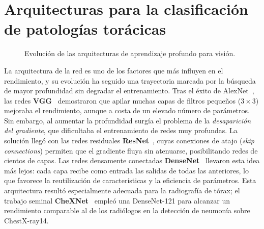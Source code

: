 \section{Arquitecturas para la clasificación de patologías torácicas}
\label{sec::ec_arquitecturas}

\begin{figure}[ht]
\centering
{}
\caption{Evolución de las arquitecturas de aprendizaje profundo para visión.}
\label{fig::ec_evolucion_arquitecturas}
\end{figure}

La arquitectura de la red es uno de los factores que más influyen en el
rendimiento, y su evolución ha seguido una trayectoria marcada por la búsqueda de
mayor profundidad sin degradar el entrenamiento. Tras el éxito de
AlexNet~\cite{krizhevskyImageNetClassification2012}, las redes
\textbf{VGG}~\cite{simonyanVeryDeepConvolutional2015} demostraron que apilar
muchas capas de filtros pequeños ($3\times3$) mejoraba el rendimiento, aunque a
costa de un elevado número de parámetros. Sin embargo, al aumentar la profundidad
surgía el problema de la \textit{desaparición del gradiente}, que dificultaba el
entrenamiento de redes muy profundas. La solución llegó con las redes residuales
\textbf{ResNet}~\cite{heDeepResidualLearning2016}, cuyas conexiones de atajo
(\textit{skip connections}) permiten que el gradiente fluya sin atenuarse,
posibilitando redes de cientos de capas. Las redes densamente conectadas
\textbf{DenseNet}~\cite{huangDenselyConnectedConvolutional2017} llevaron esta idea
más lejos: cada capa recibe como entrada las salidas de todas las anteriores, lo
que favorece la reutilización de características y la eficiencia de parámetros.
Esta arquitectura resultó especialmente adecuada para la radiografía de tórax;
el trabajo seminal \textbf{CheXNet}~\cite{rajpurkarCheXNetRadiologistLevel2017}
empleó una DenseNet-121 para alcanzar un rendimiento comparable al de los
radiólogos en la detección de neumonía sobre ChestX-ray14.

